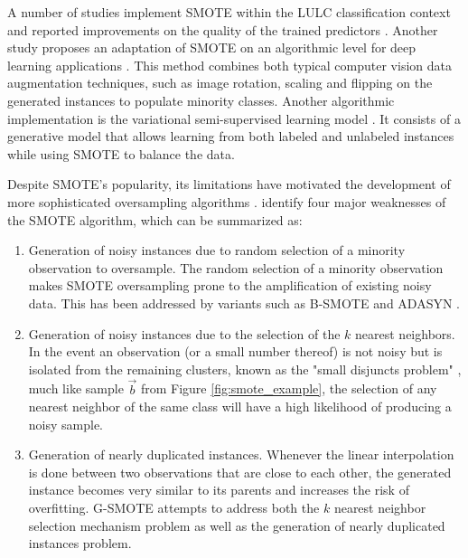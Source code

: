 \documentclass[remotesensing,article,submit,moreauthors,pdftex]{Definitions/mdpi}
\begin{document}
\begin{paracol}{2}
\linenumbers
\switchcolumn

A number of studies implement SMOTE within the LULC classification context and
reported improvements on the quality of the trained predictors
\cite{Jozdani2019, Bogner2018}. Another study proposes an adaptation of SMOTE on
an algorithmic level for deep learning applications \cite{Zhu2020}. This method
combines both typical computer vision data augmentation techniques, such as
image rotation, scaling and flipping on the generated instances to populate
minority classes. Another algorithmic implementation is the variational
semi-supervised learning model \cite{Cenggoro2018}. It consists of a generative
model that allows learning from both labeled and unlabeled instances while
using SMOTE to balance the data.

Despite SMOTE's popularity, its limitations have motivated the development of more
sophisticated oversampling algorithms \cite{Douzas2019, Han2005, Ma2017,
Douzas2017, Douzas2018, HaiboHe2008}. \cite{Douzas2019} identify four major
weaknesses of the SMOTE algorithm, which can be summarized as:
\begin{enumerate}
    \item Generation of noisy instances due to random selection of a minority
        observation to oversample. The random selection of a minority
        observation makes SMOTE oversampling prone to the amplification of
        existing noisy data. This has been addressed by variants such as B-SMOTE
        \cite{Han2005} and ADASYN \cite{HaiboHe2008}. 

    \item Generation of noisy instances due to the selection of the $k$ nearest
        neighbors. In the event an observation (or a small number thereof) is
        not noisy but is isolated from the remaining clusters, known as the
        "small disjuncts problem" \cite{holte1989}, much like sample
        $\overrightarrow{b}$ from Figure \ref{fig:smote_example}, the selection
        of any nearest neighbor of the same class will have a high likelihood of
        producing a noisy sample.

    \item Generation of nearly duplicated instances. Whenever the linear
        interpolation is done between two observations that are close to each
        other, the generated instance becomes very similar to its parents and
        increases the risk of overfitting. G-SMOTE \cite{Douzas2019} attempts to
        address both the $k$ nearest neighbor selection mechanism problem as
        well as the generation of nearly duplicated instances problem. 


\end{enumerate}
\end{paracol}
\end{document}
